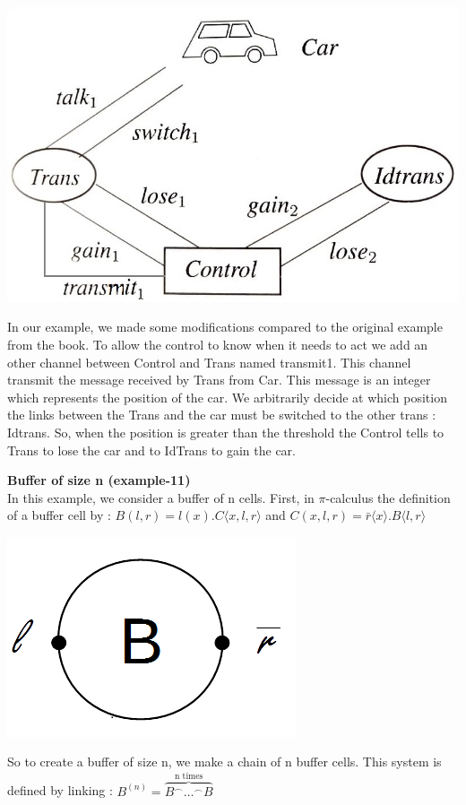 \documentclass[11pt]{report}
\begin{document}
\begin{center}
\includegraphics[scale = 0.5]{mobile-phone-system.jpg}
\end{center}
In our example, we made some modifications compared to the original example from the book. To allow the control to know when it needs to act we add an other channel between Control and Trans named transmit1. This channel transmit the message received by Trans from Car. This message is an integer which represents the position of the car. We arbitrarily decide at which position the links between the Trans and the car must be switched to the other trans : Idtrans. So, when the position is greater than the threshold the Control tells to Trans to lose the car and to IdTrans to gain the car.

\vspace*{15pt}
\tabto{0cm} {\Large \textbf{Buffer of size n (example-11)}}
\vspace*{3pt}
\\
In this example, we consider a buffer of n cells. First, in $\pi$-calculus the definition of a buffer cell by :
$B(l,r) = l(x).C \langle x,l,r \rangle$ and $C(x,l,r) = \bar{r} \langle x \rangle .B \langle l,r \rangle$

\begin{center}
\includegraphics[scale = 0.25]{BufferCell.png}
\end{center}
So to create a buffer of size n, we make a chain of n buffer cells. This system is defined by linking :
$B^{(n)} = \overbrace{B^{ \frown} \ldots ^{\frown} B}^{\text{n times}}$
\end{document}
